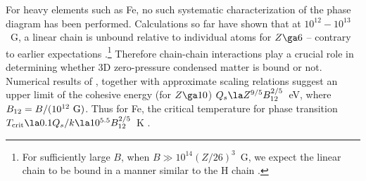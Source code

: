 \documentclass{emulateapj}
\begin{document}
For heavy elements such as Fe, no such systematic characterization of the phase 
diagram has been performed. Calculations so far have
shown that at $10^{12}-10^{13}$~G, a linear chain is unbound relative to
individual atoms for $Z\ga 6$ 
\citep{Jones,Neuhauser-ea} -- contrary
to earlier expectations \citep{Flowers-ea}.\footnote{For 
sufficiently large $B$, when $B\gg 10^{14}(Z/26)^3$~G, we expect the 
linear chain to be bound in a manner similar to the H chain \citep{Lai01}.}
Therefore chain-chain interactions play a crucial role in determining whether
3D zero-pressure condensed matter is bound or not. Numerical
results of \citet{Jones}, together with approximate scaling relations suggest
an upper limit of the cohesive energy (for $Z\ga 10$)
$Q_s\la Z^{9/5}B_{12}^{2/5}$~eV, where $B_{12}=B/(10^{12}~{\rm G})$.
Thus for Fe, the critical temperature for phase transition $T_{\rm crit}\la
0.1Q_s/k\la 10^{5.5}B_{12}^{2/5}$~K \citep{Lai01}.  
\end{document}
